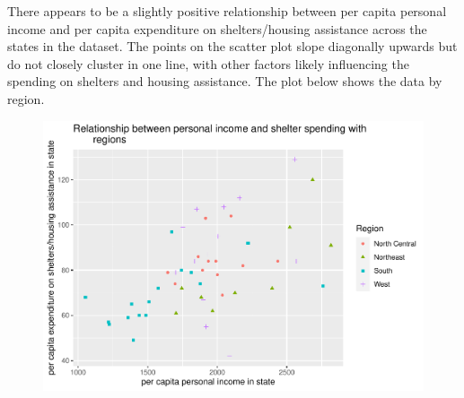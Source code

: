 \documentclass[12pt,letterpaper]{article}
\begin{document}
\noindent There appears to be a slightly positive relationship between per capita personal income and per capita expenditure on shelters/housing assistance across the states in the dataset. The points on the scatter plot slope diagonally upwards but do not closely cluster in one line, with other factors likely influencing the spending on shelters and housing assistance. The plot below shows the data by region. 

\begin{figure}[h!]\centering
	\label{fig:plot_1}
	\includegraphics[width=.70\textwidth]{Plot 3.5.pdf}
\end{figure}
\end{document}
